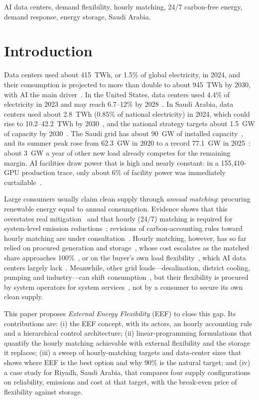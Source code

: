 \documentclass[conference]{IEEEtran}
\begin{document}
\begin{IEEEkeywords}
AI data centers, demand flexibility, hourly matching, 24/7 carbon-free energy, demand response, energy storage, Saudi Arabia.
\end{IEEEkeywords}

\section{Introduction}
Data centers used about 415~TWh, or 1.5\% of global electricity, in 2024, and their consumption is projected to more than double to about 945~TWh by 2030, with AI the main driver~\cite{r40}. In the United States, data centers used 4.4\% of electricity in 2023 and may reach 6.7--12\% by 2028~\cite{r1}. In Saudi Arabia, data centers used about 2.8~TWh (0.85\% of national electricity) in 2024, which could rise to 10.2--42.2~TWh by 2030~\cite{kapsarcdc}, and the national strategy targets about 1.5~GW of capacity by 2030~\cite{r52}. The Saudi grid has about 90~GW of installed capacity~\cite{v2030cap}, and its summer peak rose from 62.3~GW in 2020 to a record 77.1~GW in 2025~\cite{r23,mees2026}: about 3~GW a year of other new load already competes for the remaining margin. AI facilities draw power that is high and nearly constant: in a 155{,}410-GPU production trace, only about 6\% of facility power was immediately curtailable~\cite{r26}.

Large consumers usually claim clean supply through \emph{annual matching}: procuring renewable energy equal to annual consumption. Evidence shows that this overstates real mitigation~\cite{r12} and that hourly (24/7) matching is required for system-level emission reductions~\cite{r10,r11}; revisions of carbon-accounting rules toward hourly matching are under consultation~\cite{r50}. Hourly matching, however, has so far relied on procured generation and storage~\cite{r11,r14,r16}, whose cost escalates as the matched share approaches 100\%~\cite{r15}, or on the buyer's own load flexibility~\cite{r9,r10}, which AI data centers largely lack~\cite{r26}. Meanwhile, other grid loads---desalination, district cooling, pumping and industry---can shift consumption~\cite{r19,r20,r23}, but their flexibility is procured by system operators for system services~\cite{r17,r18}, not by a consumer to secure its own clean supply.

This paper proposes \emph{External Energy Flexibility} (EEF) to close this gap. Its contributions are: (i) the EEF concept, with its actors, an hourly accounting rule and a hierarchical control architecture; (ii) linear-programming formulations that quantify the hourly matching achievable with external flexibility and the storage it replaces; (iii) a sweep of hourly-matching targets and data-center sizes that shows where EEF is the best option and why 90\% is the natural target; and (iv) a case study for Riyadh, Saudi Arabia, that compares four supply configurations on reliability, emissions and cost at that target, with the break-even price of flexibility against storage.
\end{document}
